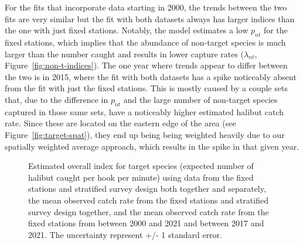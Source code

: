 \documentclass[12pt]{article}\usepackage[]{graphicx}\usepackage[]{color}
\begin{document}
For the fits that incorporate data starting in 2000, the trends between the two fits are very similar but the fit with both datasets always has larger indices than the one with just fixed stations. Notably, the model estimates a low \(p_{nt}\) for the fixed stations, which implies that the abundance of non-target species is much larger than the number caught and results in lower capture rates (\(\lambda_{nt}\), Figure~\ref{fig:non-t-indices}). The one year where trends appear to differ between the two is in 2015, where the fit with both datasets has a spike noticeably absent from the fit with just the fixed stations. This is mostly caused by a couple sets that, due to the difference in \(p_{nt}\) and the large number of non-target species captured in those same sets, have a noticeably higher estimated halibut catch rate. Since these are located on the eastern edge of the area (see Figure~\ref{fig:target-spat}), they end up being being weighted heavily due to our spatially weighted average approach, which results in the spike in that given year.
\begin{figure}[htb]

{\centering {}  

}

\caption{Estimated overall index for target species (expected number of halibut caught per hook per minute) using data from the fixed stations and stratified survey design both together and separately, the mean observed catch rate from the fixed stations and stratified survey design together, and the mean observed catch rate from the fixed stations from between 2000 and 2021 and between 2017 and 2021. The uncertainty represent +/- 1 standard error.}\label{fig:target-indices}
\end{figure}
\end{document}

